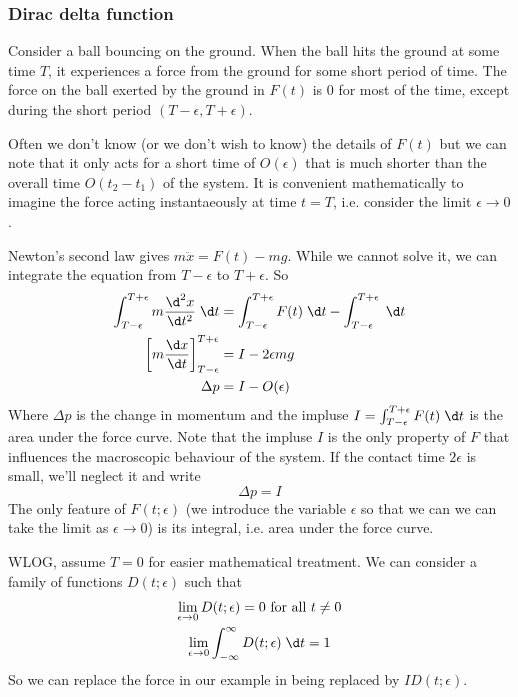 \documentclass[a4paper]{article}
\begin{document}
\subsubsection{Dirac delta function}
Consider a ball bouncing on the ground. When the ball hits the ground at some time $T$, it experiences a force from the ground for some short period of time. The force on the ball exerted by the ground in $F(t)$ is $0$ for most of the time, except during the short period $(T - \epsilon, T + \epsilon)$.

Often we don't know (or we don't wish to know) the details of $F(t)$ but we can note that it only acts for a short time of $O(\epsilon)$ that is much shorter than the overall time $O(t_2 - t_1)$ of the system. It is convenient mathematically to imagine the force acting instantaeously at time $t = T$, i.e. consider the limit $\epsilon\to 0$.

Newton's second law gives $m\ddot x = F(t) - mg$. While we cannot solve it, we can integrate the equation from $T - \epsilon$ to $T + \epsilon$. So 
\begin{align*}
  \int_{T - \epsilon}^{T + \epsilon} m\frac{\d ^2 x}{\d t^2}\;\d t &= \int_{T - \epsilon}^{T + \epsilon} F(t)\;\d t - \int_{T - \epsilon}^{T + \epsilon}\;\d t\\
  \left[ m\frac{\d x}{\d t}\right]^{T + \epsilon}_{T - \epsilon} &= I - 2\epsilon mg\\
  \Delta p &= I - O(\epsilon)
\end{align*}
Where $\Delta p$ is the change in momentum and the impluse $I = \int_{T - \epsilon}^{T + \epsilon} F(t) \;\d t$ is the area under the force curve. Note that the impluse $I$ is the only property of $F$ that influences the macroscopic behaviour of the system. If the contact time $2\epsilon$ is small, we'll neglect it and write 
\[
\Delta p = I
\]
The only feature of $F(t; \epsilon)$ (we introduce the variable $\epsilon$ so that we can we can take the limit as $\epsilon \to 0$) is its integral, i.e. area under the force curve.

WLOG, assume $T = 0$ for easier mathematical treatment. We can consider a family of functions $D(t; \epsilon)$ such that 
\begin{gather*}
\lim_{\epsilon\to 0} D(t; \epsilon) = 0 \text{ for all }t \not= 0\\
\lim_{\epsilon\to 0}\int_{-\infty}^\infty D(t; \epsilon) \;\d t = 1
\end{gather*}
So we can replace the force in our example in being replaced by $ID(t; \epsilon)$.
\end{document}
